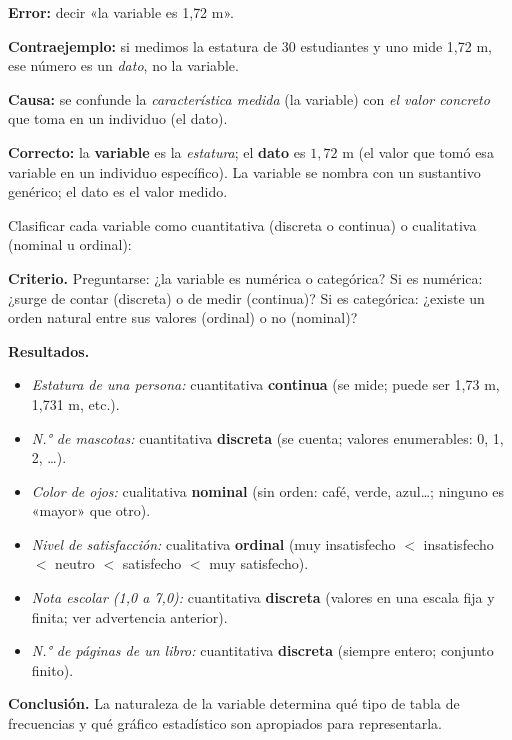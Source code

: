 \documentclass[11pt, letterpaper]{article}
\begin{document}
\begin{tcolorbox}[warningbox, title={Error frecuente: confundir variable con dato}]
\textbf{Error:} decir «la variable es 1{,}72 m».

\medskip

\textbf{Contraejemplo:} si medimos la estatura de 30 estudiantes y uno mide 1{,}72 m, ese número es un \textit{dato}, no la variable.

\medskip

\textbf{Causa:} se confunde la \textit{característica medida} (la variable) con \textit{el valor concreto} que toma en un individuo (el dato).

\medskip

\textbf{Correcto:} la \textbf{variable} es la \textit{estatura}; el \textbf{dato} es $1{,}72$ m (el valor que tomó esa variable en un individuo específico). La variable se nombra con un sustantivo genérico; el dato es el valor medido.
\end{tcolorbox}

\begin{tcolorbox}[examplebox, title={Ej. 2. Clasificar variables}]
Clasificar cada variable como cuantitativa (discreta o continua) o cualitativa (nominal u ordinal):

\noindent\textbf{Criterio.} Preguntarse: ¿la variable es numérica o categórica? Si es numérica: ¿surge de contar (discreta) o de medir (continua)? Si es categórica: ¿existe un orden natural entre sus valores (ordinal) o no (nominal)?

\medskip

\noindent\textbf{Resultados.}
\begin{itemize}
  \item \textit{Estatura de una persona:} cuantitativa \textbf{continua} (se mide; puede ser 1{,}73 m, 1{,}731 m, etc.).
  \item \textit{N.° de mascotas:} cuantitativa \textbf{discreta} (se cuenta; valores enumerables: 0, 1, 2, \ldots).
  \item \textit{Color de ojos:} cualitativa \textbf{nominal} (sin orden: café, verde, azul\ldots; ninguno es «mayor» que otro).
  \item \textit{Nivel de satisfacción:} cualitativa \textbf{ordinal} (muy insatisfecho $<$ insatisfecho $<$ neutro $<$ satisfecho $<$ muy satisfecho).
  \item \textit{Nota escolar (1{,}0 a 7{,}0):} cuantitativa \textbf{discreta} (valores en una escala fija y finita; ver advertencia anterior).
  \item \textit{N.° de páginas de un libro:} cuantitativa \textbf{discreta} (siempre entero; conjunto finito).
\end{itemize}

\medskip

\noindent\textbf{Conclusión.} La naturaleza de la variable determina qué tipo de tabla de frecuencias y qué gráfico estadístico son apropiados para representarla.
\end{tcolorbox}
\end{document}

